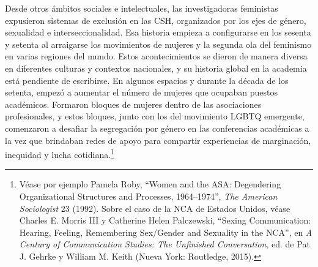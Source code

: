 \documentclass{tufte-handout}
\begin{document}
Desde otros ámbitos sociales e intelectuales, las investigadoras
feministas expusieron sistemas de exclusión en las CSH, organizados por
los ejes de género, sexualidad e interseccionalidad. Esa historia
empieza a configurarse en los sesenta y setenta al arraigarse los
movimientos de mujeres y la segunda ola del feminismo en varias regiones
del mundo. Estos acontecimientos se dieron de manera diversa en
diferentes culturas y contextos nacionales, y su historia global en la
academia está pendiente de escribirse. En algunos espacios y durante la
década de los setenta, empezó a aumentar el número de mujeres que
ocupaban puestos académicos. Formaron bloques de mujeres dentro de las
asociaciones profesionales, y estos bloques, junto con los del
movimiento LGBTQ emergente, comenzaron a desafiar la segregación por
género en las conferencias académicas a la vez que brindaban redes de
apoyo para compartir experiencias de marginación, inequidad y lucha
cotidiana.\footnote{Véase por ejemplo Pamela Roby, ``Women and the ASA:
  Degendering Organizational Structures and Processes, 1964--1974'',
  \emph{The American Sociologist} 23 (1992). Sobre el caso de la NCA de
  Estados Unidos, véase Charles E. Morris III y Catherine Helen
  Palczewski, ``Sexing Communication: Hearing, Feeling, Remembering
  Sex/Gender and Sexuality in the NCA'', en \emph{A Century of
  Communication Studies: The Unfinished Conversation}, ed. de Pat J.
  Gehrke y William M. Keith (Nueva York: Routledge, 2015).}
\end{document}
